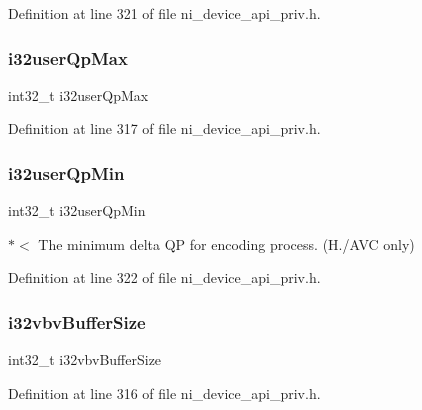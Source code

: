 Definition at line 321 of file ni\+\_\+device\+\_\+api\+\_\+priv.\+h.

\mbox{\label{struct__ni__encoder__config__t_a749afa769fcfcd4362cc1c241a7012b2}} 
\subsubsection{\texorpdfstring{i32userQpMax}{i32userQpMax}}
{\footnotesize\ttfamily int32\+\_\+t i32user\+Qp\+Max}



Definition at line 317 of file ni\+\_\+device\+\_\+api\+\_\+priv.\+h.

\mbox{\label{struct__ni__encoder__config__t_a9b1cfbd3a3870bb01998056e6d3cd2e4}} 
\subsubsection{\texorpdfstring{i32userQpMin}{i32userQpMin}}
{\footnotesize\ttfamily int32\+\_\+t i32user\+Qp\+Min}

$\ast$$<$ The minimum delta QP for encoding process. (H./\+A\+VC only) 

Definition at line 322 of file ni\+\_\+device\+\_\+api\+\_\+priv.\+h.

\mbox{\label{struct__ni__encoder__config__t_a8809f2a97609539b668988331b9fe6ba}} 
\subsubsection{\texorpdfstring{i32vbvBufferSize}{i32vbvBufferSize}}
{\footnotesize\ttfamily int32\+\_\+t i32vbv\+Buffer\+Size}



Definition at line 316 of file ni\+\_\+device\+\_\+api\+\_\+priv.\+h.

